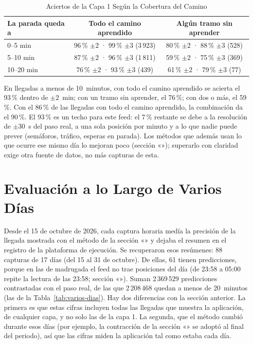 \begin{table}[ht]
\centering
\caption{Aciertos de la Capa 1 Según la Cobertura del Camino}\label{tab:cobertura}
\begin{tabular}{@{}lcc@{}}
\toprule
La parada queda a & Todo el camino aprendido & Algún tramo sin aprender\\
\midrule
0--5 min   & 96\,\% $\pm2$ · 99\,\% $\pm3$ (3\,923) & 80\,\% $\pm2$ · 88\,\% $\pm3$ (528)\\
5--10 min  & 87\,\% $\pm2$ · 96\,\% $\pm3$ (1\,811) & 59\,\% $\pm2$ · 75\,\% $\pm3$ (369)\\
10--20 min & 76\,\% $\pm2$ · 93\,\% $\pm3$ (439)   & 61\,\% $\pm2$ · 79\,\% $\pm3$ (77)\\
\bottomrule
\end{tabular}
\end{table}

En llegadas a menos de 10~minutos, con todo el camino aprendido se acierta el 93\,\% dentro de $\pm2$~min; con un tramo
sin aprender, el 76\,\%; con dos o más, el 59\,\%. Con el 86\,\% de las llegadas con todo el camino aprendido, la
combinación da el 90\,\%. El 93\,\% es un techo para este feed: el 7\,\% restante se debe a la resolución de $\pm30$~s
del paso real, a una sola posición por minuto y a lo que nadie puede prever (semáforos, tráfico, esperas en parada).
Los métodos que además usan lo que ocurre ese mismo día lo mejoran poco (sección
«»); superarlo con claridad exige otra fuente de datos, no más capturas de esta.

\section{Evaluación a lo Largo de Varios Días}
\label{sec:varios-dias}

Desde el 15 de octubre de 2026, cada captura horaria medía la precisión de la llegada mostrada con el método de la
sección «» y dejaba el resumen en el registro de la plataforma de ejecución. Se recuperaron esos
resúmenes: 88 capturas de 17 días (del 15 al 31 de octubre). De ellas, 61 tienen predicciones, porque en las de
madrugada el feed no trae posiciones del día (de 23:58 a 05:00 repite la lectura de las 23:58; sección
«»). Suman 2\,369\,529 predicciones contrastadas con el paso real, de las que 2\,208\,468 quedan a
menos de 20~minutos (las de la Tabla~\ref{tab:varios-dias}). Hay dos diferencias con la sección anterior. La primera
es que estas cifras incluyen todas las llegadas que muestra la aplicación, de cualquier capa, y no solo las de la
capa 1. La segunda, que el método cambió durante esos días (por ejemplo, la contracción de la
sección «» se adoptó al final del periodo), así que las cifras miden la aplicación tal
como estaba cada día.

